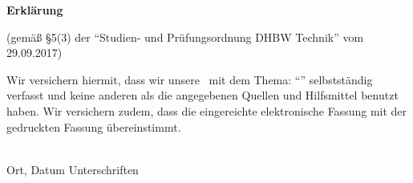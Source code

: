 \cleardoublepage
\thispagestyle{empty}

\begin{framed}
	\begin{center}
		\textsf{\huge{\textbf{Erklärung}}}
	\end{center}
	\medskip
	\noindent	
	
	(gemäß §5(3) der \enquote{Studien- und Prüfungsordnung DHBW Technik} vom 29.09.2017)
	
	\smallskip
	
	Wir versichern hiermit, dass wir unsere \typeofwork~mit dem Thema: \enquote{\titleofwork} selbstständig verfasst und keine anderen als die angegebenen Quellen und Hilfsmittel benutzt haben. Wir versichern zudem, dass die eingereichte elektronische Fassung mit der gedruckten Fassung übereinstimmt.		
	
	\vspace{1.5cm}
	\noindent
	\underline{\hspace{6cm}}
	\hfill
	\underline{\hspace{6cm}}\\Ort, Datum
	\hfill Unterschriften\hspace{4cm}
\end{framed}

\vfill

%	
